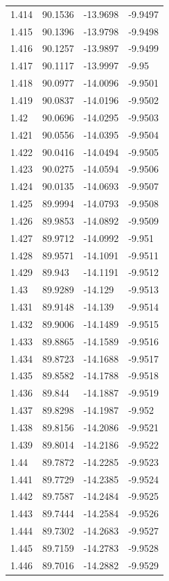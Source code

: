 \begin{tabular}{llll}
1.414 & 90.1536 & -13.9698 & -9.9497 \\
1.415 & 90.1396 & -13.9798 & -9.9498 \\
1.416 & 90.1257 & -13.9897 & -9.9499 \\
1.417 & 90.1117 & -13.9997 & -9.95 \\
1.418 & 90.0977 & -14.0096 & -9.9501 \\
1.419 & 90.0837 & -14.0196 & -9.9502 \\
1.42 & 90.0696 & -14.0295 & -9.9503 \\
1.421 & 90.0556 & -14.0395 & -9.9504 \\
1.422 & 90.0416 & -14.0494 & -9.9505 \\
1.423 & 90.0275 & -14.0594 & -9.9506 \\
1.424 & 90.0135 & -14.0693 & -9.9507 \\
1.425 & 89.9994 & -14.0793 & -9.9508 \\
1.426 & 89.9853 & -14.0892 & -9.9509 \\
1.427 & 89.9712 & -14.0992 & -9.951 \\
1.428 & 89.9571 & -14.1091 & -9.9511 \\
1.429 & 89.943 & -14.1191 & -9.9512 \\
1.43 & 89.9289 & -14.129 & -9.9513 \\
1.431 & 89.9148 & -14.139 & -9.9514 \\
1.432 & 89.9006 & -14.1489 & -9.9515 \\
1.433 & 89.8865 & -14.1589 & -9.9516 \\
1.434 & 89.8723 & -14.1688 & -9.9517 \\
1.435 & 89.8582 & -14.1788 & -9.9518 \\
1.436 & 89.844 & -14.1887 & -9.9519 \\
1.437 & 89.8298 & -14.1987 & -9.952 \\
1.438 & 89.8156 & -14.2086 & -9.9521 \\
1.439 & 89.8014 & -14.2186 & -9.9522 \\
1.44 & 89.7872 & -14.2285 & -9.9523 \\
1.441 & 89.7729 & -14.2385 & -9.9524 \\
1.442 & 89.7587 & -14.2484 & -9.9525 \\
1.443 & 89.7444 & -14.2584 & -9.9526 \\
1.444 & 89.7302 & -14.2683 & -9.9527 \\
1.445 & 89.7159 & -14.2783 & -9.9528 \\
1.446 & 89.7016 & -14.2882 & -9.9529 \\

\end{tabular}
